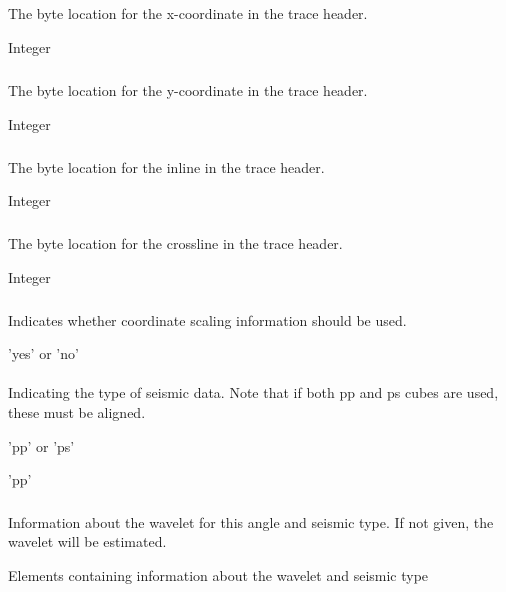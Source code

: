 \subparagraph{}
 \slist
   \item \Description The byte location for the x-coordinate in the trace header.
   \item \Argument Integer
   \item \Default
 \elist

\subparagraph{}
 \slist
   \item \Description The byte location for the y-coordinate in the trace header.
   \item \Argument Integer
   \item \Default
 \elist

\subparagraph{}
 \slist
   \item \Description The byte location for the inline in the trace header.
   \item \Argument Integer
   \item \Default
 \elist

\subparagraph{}
 \slist
   \item \Description The byte location for the crossline in the trace header.
   \item \Argument Integer
   \item \Default
 \elist

\subparagraph{}
 \slist
   \item \Description Indicates whether coordinate scaling information should be used.
   \item \Argument 'yes' or 'no'
   \item \Default
 \elist

\paragraph{}
 \slist
   \item \Description Indicating the type of seismic data. Note that if both pp and ps cubes are used, these must be aligned.
   \item \Argument 'pp' or 'ps'
   \item \Default 'pp'
 \elist

\subsubsection{}
 \slist
   \item \Description Information about the wavelet for this angle and seismic type. If not given, the wavelet will be estimated.
   \item \Argument Elements containing information about the wavelet and seismic type
   \item \Default
 \elist

